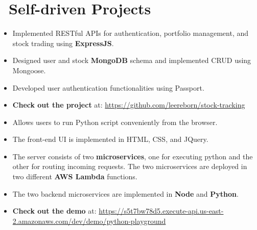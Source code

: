 \documentclass{resume}
\begin{document}
\section{\faUsers\ Self-driven Projects}
\begin{itemize}
	\item Implemented RESTful APIs for authentication, portfolio management, and stock trading using \textbf{ExpressJS}.
	\item Designed user and stock \textbf{MongoDB} schema and implemented CRUD using Mongoose.
	\item Developed user authentication functionalities using Passport.
	\item \textbf{Check out the project} at: \url{https://github.com/leereborn/stock-tracking}
\end{itemize}

\begin{itemize}
	\item Allows users to run Python script conveniently from the browser. 
	\item The front-end UI is implemented in HTML, CSS, and JQuery.
	\item The server consists of two \textbf{microservices}, one for executing python and the other for routing incoming requests. The two microservices are deployed in two different \textbf{AWS Lambda} functions.
	\item The two backend microservices are implemented in \textbf{Node} and \textbf{Python}.
	\item \textbf{Check out the demo} at: \url{https://s5t7bw78d5.execute-api.us-east-2.amazonaws.com/dev/demo/python-playground}  
\end{itemize}

\iffalse
\datedsubsection{Document File Search Engine}{Mar. 2018}
\begin{itemize}
	\item Implemented document parser using Tika to parse documents in given directories and stored contents and metadata into Mongodb.
	\item Developed document analyzer in \textbf{Java} using Lucene to index and score the stored documents given a query string.
	\item Implemented RESTful APIs using \textbf{Spring Boot} to provide search results.
\end{itemize}
\fi

\iffalse
\datedsubsection{Unix Log Analyzer Web App}{Mar. 2018}
\begin{itemize}
	\item Implemented the RESTful server using Node and MongoDB which allows users to upload and store Unix-like OS logs.
	\item Designed and implemented interactive React UI components for users to query and visualize logs. 
\end{itemize}
\fi
\end{document}
